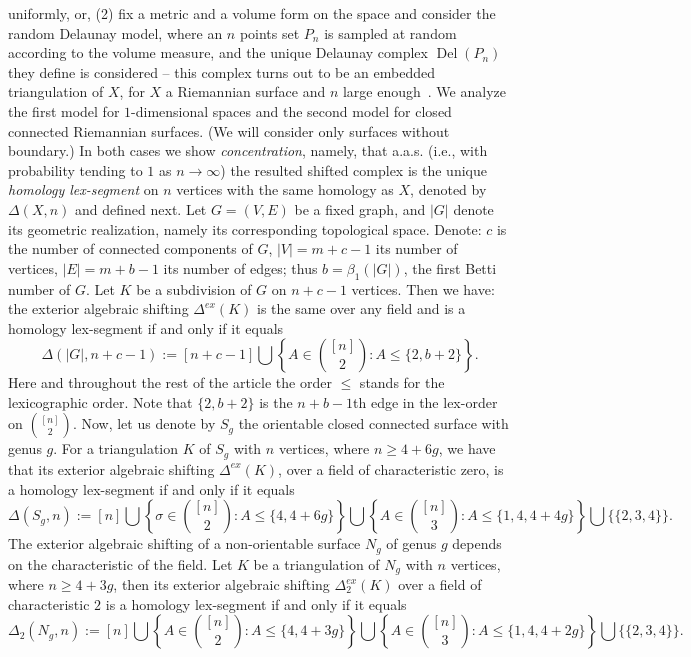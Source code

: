 \documentclass[11pt]{article}
\numberwithin{claimcounter}{theorem}
\theoremstyle{remark}
\theoremstyle{definition}
\numberwithin{theorem}{section}
\DeclareMathOperator{\Del}{Del}
\newcommand{\exshift}[1]{\Delta^{ex}(#1)}
\begin{document}
uniformly, or, 
(2)
fix a metric and a volume form on the space
and consider the random Delaunay model, where an $n$ points set $P_n$ is sampled at random according to the volume measure, and the unique Delaunay complex $\Del(P_n)$ they define is considered -- this complex turns out to be an embedded triangulation of $X$, for $X$ a Riemannian surface and $n$ large enough~\cite{leibon99-delaunay,dyer08-surface}. 
%
%
We analyze the first model for $1$-dimensional spaces and the second model for closed connected Riemannian surfaces. (We will consider only surfaces without boundary.) 
In both cases we show \textit{concentration}, namely, that a.a.s. (i.e., with probability tending to $1$ as $n\to\infty$) the resulted shifted complex is the unique \emph{homology lex-segment} on $n$ vertices with the same homology as $X$, denoted by $\Delta(X,n)$ and defined next. 
%
Let $G=(V,E)$ be a fixed graph, and $|G|$ denote its geometric realization, namely its corresponding topological space. Denote: $c$ is the number of connected components of $G$, $|V|=m+c-1$ its number of vertices, $|E|=m+b-1$ its number of edges; thus $b=\beta_1(|G|)$, the first Betti number of $G$.
Let $K$ be a subdivision of $G$ on $n+c-1$ vertices. Then we have: the exterior algebraic shifting $\exshift K$ is the same over any field and 
is a homology lex-segment if and only if it equals 
$$\Delta(|G|,n+c-1) := [n+c-1] \bigcup \left \{A \in \binom{[n]}{2}\colon A \leq \{2,b+2\} \right \}.$$
Here and throughout the rest of the article the order $\leq$ stands for the lexicographic order.
Note that $\{2,b+2\}$ is the $n+b-1$th edge in the lex-order on $\binom{[n]}{2}$.
%
Now, let us denote by $S_g$ the orientable closed connected surface with genus $g$. For a triangulation $K$ of $S_g$ with $n$ vertices, where $n\ge 4+6g$, we have that its exterior algebraic shifting
$\exshift K$, over a field of characteristic zero,
is a homology lex-segment if and only if it equals 
$$\Delta(S_g, n):= [n] \bigcup \left \{\sigma\in \binom{[n]}{2}\colon A \leq \{4,4+6g\} \right \} \bigcup \left \{ A \in \binom{[n]}{3} \colon A \leq \{1,4,4+4g\} \right \} \bigcup \{\{2,3,4\}\}.$$
%
The exterior algebraic shifting of a non-orientable surface $N_g$ of genus $g$ depends on the characteristic of the field.
Let $K$ be a triangulation of $N_g$ with $n$ vertices, where $n\geq 4+3g$, then its exterior algebraic shifting $\Delta^{ex}_2(K)$ over a field of characteristic $2$ is a homology lex-segment if and only if it equals
$$\Delta_2(N_g, n):= [n] \bigcup \left \{A \in \binom{[n]}{2}\colon A \leq \{4,4+3g\} \right \} \bigcup \left \{ A \in \binom{[n]}{3} \colon A \leq \{1,4,4+2g\} \right \} \bigcup \{\{2,3,4\}\}.$$
\end{document}
